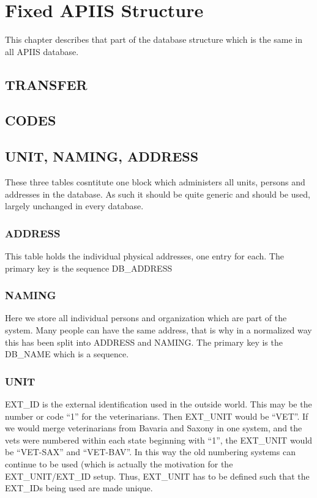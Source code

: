 \chapter{Fixed APIIS Structure}

This chapter describes that part of the database structure which is
the same in all APIIS database.


\section{TRANSFER}


\section{CODES}


\section{UNIT, NAMING, ADDRESS}

These three tables cosntitute one block which administers all units,
persons and addresses in the database. As such it should be quite
generic and should be used, largely unchanged in every database.


\subsection{ADDRESS}

This table holds the individual physical addresses, one entry for
each. The primary key is the sequence DB\_ADDRESS


\subsection{NAMING}

Here we store all individual persons and organization which are part
of the system. Many people can have the same address, that is why
in a normalized way this has been split into ADDRESS and NAMING. The
primary key is the DB\_NAME which is a sequence.


\subsection{UNIT}

EXT\_ID is the external identification used in the outside world.
This may be the number or code {}``1'' for the veterinarians. Then
EXT\_UNIT would be {}``VET''. If we would merge veterinarians from
Bavaria and Saxony in one system, and the vets were numbered within
each state beginning with {}``1'', the EXT\_UNIT would be {}``VET-SAX''
and {}``VET-BAV''. In this way the old numbering systems can continue
to be used (which is actually the motivation for the EXT\_UNIT/EXT\_ID
setup. Thus, EXT\_UNIT has to be defined such that the EXT\_IDs being
used are made unique.

